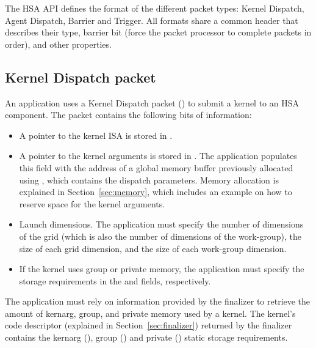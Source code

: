 \documentclass[final,oneside]{book}
\begin{document}
The HSA API defines the format of the different packet types: Kernel Dispatch,
Agent Dispatch, Barrier and Trigger. All formats share a common header
 that describes their type, barrier bit (force the
packet processor to complete packets in order), and other properties.

\subsection{Kernel Dispatch packet}\label{dispatch-packet}

An application uses a Kernel Dispatch packet
() to submit a kernel to an HSA
component. The packet contains the following bits of information:
\begin{itemize}[itemsep=1pt,topsep=3pt,partopsep=0pt]
\item A pointer to the kernel ISA is stored in
  .
\item A pointer to the kernel arguments is stored in
  . The application
  populates this field with the address of a global memory buffer previously
  allocated using , which contains the dispatch
  parameters. Memory allocation is explained in Section~\ref{sec:memory}, which
  includes an example on how to reserve space for the kernel arguments.
\item Launch dimensions. The application must specify the number of dimensions
  of the grid (which is also the number of dimensions of the work-group), the
  size of each grid dimension, and the size of each work-group dimension.
\item If the kernel uses group or private memory, the application must specify
  the storage requirements in the
   and
   fields,
  respectively.
\end{itemize}

The application must rely on information provided by the finalizer to retrieve
the amount of kernarg, group, and private memory used by a kernel. The kernel's
code descriptor (explained in Section~\ref{sec:finalizer}) returned by the
finalizer contains the kernarg
(), group
() and
private ()
static storage requirements.
\end{document}
